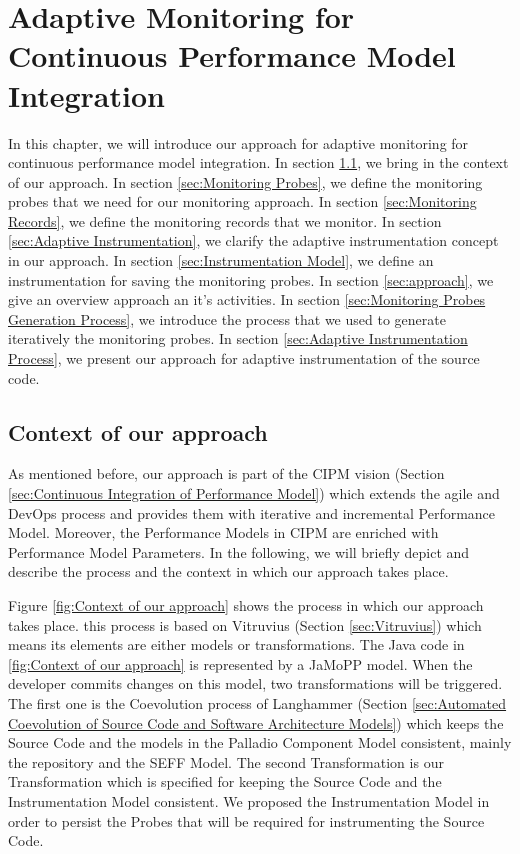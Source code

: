 

\chapter{Adaptive Monitoring for Continuous Performance Model Integration}
\label{ch:Adaptive Monitoring for Continuous Performance Model Integration}
In this chapter, we will introduce our approach for adaptive monitoring for continuous performance model integration. In section \ref{sec:Context of our approach}, we bring in the context of our approach. In section \ref{sec:Monitoring Probes}, we define the monitoring probes that we need for our monitoring approach. In section \ref{sec:Monitoring Records}, we define the monitoring records that we monitor. In section \ref{sec:Adaptive Instrumentation}, we clarify the adaptive instrumentation concept in our approach. In section \ref{sec:Instrumentation Model}, we define an instrumentation for saving the monitoring probes. In section \ref{sec:approach}, we give an overview approach an it's activities. In section \ref{sec:Monitoring Probes Generation Process}, we introduce the process that we used to generate iteratively the monitoring probes. In section \ref{sec:Adaptive Instrumentation Process}, we present our approach for adaptive instrumentation of the source code. 

\section{Context of our approach}
\label{sec:Context of our approach}
As mentioned before, our approach is part of the CIPM vision (Section \ref{sec:Continuous Integration of Performance Model}) which extends the agile and DevOps process and provides them with iterative and incremental Performance Model. Moreover, the Performance Models in CIPM are enriched with Performance Model Parameters. In the following, we will briefly depict and describe the process and the context in which our approach takes place.

Figure \ref{fig:Context of our approach} shows the process in which our approach takes place. this process is based on Vitruvius (Section \ref{sec:Vitruvius}) which means its elements are either models or transformations. The Java code in \ref{fig:Context of our approach} is represented by a JaMoPP model. When the developer commits changes on this model, two transformations will be triggered. The first one is the Coevolution process of Langhammer (Section \ref{sec:Automated Coevolution of Source Code and Software Architecture Models}) which keeps the Source Code and the models in the Palladio Component Model consistent, mainly the repository and the SEFF Model. The second Transformation is our Transformation which is specified for keeping the Source Code and the Instrumentation Model consistent. We proposed the Instrumentation Model in order to persist the Probes that will be required for instrumenting the Source Code.

